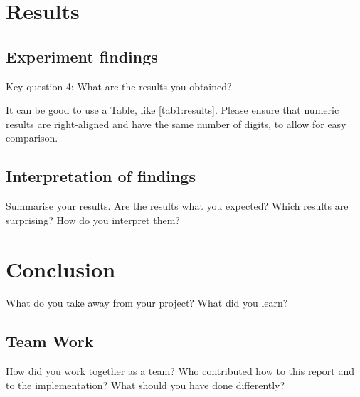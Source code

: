 \documentclass[a4paper,11pt]{article}
\begin{document}
\section{Results}

\subsection{Experiment findings}

Key question 4: What are the results you obtained?

It can be good to use a Table, like \autoref{tab1:results}.
Please ensure that numeric results are right-aligned and have the same number of digits, to allow for easy comparison.



\subsection{Interpretation of findings}

Summarise your results.
Are the results what you expected?
Which results are surprising?
How do you interpret them?

\section{Conclusion}

What do you take away from your project?
What did you learn?



\subsection{Team Work}

How did you work together as a team?
Who contributed how to this report and to the implementation?
What should you have done differently?

\printbibliography
\end{document}
